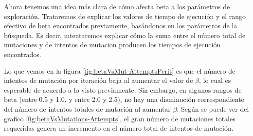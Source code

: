 




Ahora tenemos una idea más clara de cómo afecta beta a los parámetros de exploración.
Trataremos de explicar los valores de tiempo de ejecución y el rango efectivo de beta encontrados previamente, basándonos en los parámetros de la búsqueda.
Es decir, intentaremos explicar cómo la suma entre el número total de mutaciones y de intentos de mutacion producen los tiempos de ejecución encontrados. 

Lo que vemos en la figura \ref{fig:betaVsMut-AttemptsPerit} es que el número de intentos de mutación por iteración baja al aumentar el valor de $\beta$, lo cual es esperable de acuerdo a lo visto previamente.
Sin embargo, en algunos rangos de beta (entre 0.5 y 1.0, y entre 2.0 y 2.5), no hay una disminución correspondiente del número de intentos totales de mutación al aumentar $\beta$. 
Según se puede ver del grafico \ref{fig:betaVsMutations-Attempts}, el gran número de mutaciones totales requeridas genera un incremento en el número total de intentos de mutación. 










